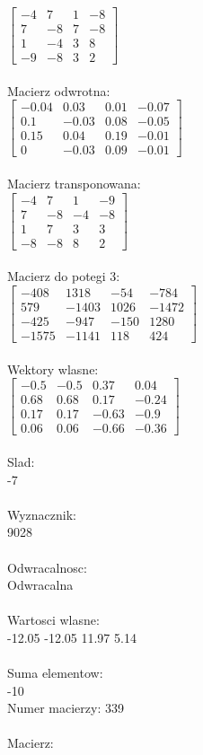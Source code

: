 \documentclass[a4paper,12pt]{article}
\begin{document}
$\begin{bmatrix} -4&7&1&-8\\7&-8&7&-8\\1&-4&3&8\\-9&-8&3&2 \end{bmatrix}$
\\
\\
Macierz odwrotna:\\

$\begin{bmatrix} -0.04&0.03&0.01&-0.07\\0.1&-0.03&0.08&-0.05\\0.15&0.04&0.19&-0.01\\0&-0.03&0.09&-0.01 \end{bmatrix}$
\\
\\
Macierz transponowana:\\

$\begin{bmatrix} -4&7&1&-9\\7&-8&-4&-8\\1&7&3&3\\-8&-8&8&2 \end{bmatrix}$
\\
\\
Macierz do potegi 3:\\

$\begin{bmatrix} -408&1318&-54&-784\\579&-1403&1026&-1472\\-425&-947&-150&1280\\-1575&-1141&118&424 \end{bmatrix}$
\\
\\
Wektory wlasne:\\

$\begin{bmatrix} -0.5&-0.5&0.37&0.04\\0.68&0.68&0.17&-0.24\\0.17&0.17&-0.63&-0.9\\0.06&0.06&-0.66&-0.36 \end{bmatrix}$
\\
\\
Slad:\\
-7
\\
\\
Wyznacznik:\\
9028
\\
\\
Odwracalnosc:\\
Odwracalna
\\
\\
Wartosci wlasne:\\
-12.05 -12.05 11.97 5.14
\\
\\
Suma elementow:\\
-10
\\
\newpage
Numer macierzy:
339
\\
\\
Macierz:\\
\end{document}
